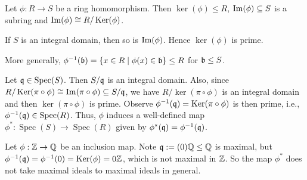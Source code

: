 \begin{fact}\label{1.16}
    Let $\phi: R \to S$ be a ring homomorphism. Then $\ker(\phi) \leq R$, $\operatorname{Im}(\phi) \subseteq S$ is a subring and $\operatorname{Im}(\phi) \cong R/\operatorname{Ker}(\phi)$. \par 
    If $S$ is an integral domain, then so is $\operatorname{Im}(\phi)$. Hence $\ker(\phi)$ is prime. \par
    More generally, $\phi^{-1}(\mathfrak{b}) = \{x \in R \mid \phi(x) \in \mathfrak{b}\} \leq R$ for $\mathfrak{b} \leq S$.
    \begin{center}
    \end{center}
    \par
    Let $\mathfrak{q} \in \operatorname{Spec}(S)$. Then $S/\mathfrak{q}$ is an integral domain. Also, since $R/\operatorname{Ker}(\pi \circ \phi) \cong \operatorname{Im}(\pi \circ \phi) \subseteq S/\mathfrak{q}$, we have $R/\ker(\pi \circ \phi)$ is an integral domain and then $\ker(\pi \circ \phi)$ is prime. Observe $\phi^{-1}(\mathfrak{q}) = \operatorname{Ker}(\pi \circ \phi)$ is then prime, i.e., $\phi^{-1}(\mathfrak{q}) \in \operatorname{Spec}(R)$. Thus, $\phi$ induces a well-defined map $\phi^*: \operatorname{Spec}(S) \to \operatorname{Spec}(R)$ given by $\phi^*(\mathfrak{q}) = \phi^{-1}(\mathfrak{q})$.
    \end{fact}

\begin{example*}
    Let $\phi: \mathbb{Z} \to \mathbb{Q}$ be an inclusion map. Note $\mathfrak{q} := (0)\mathbb{Q} \leq \mathbb{Q}$ is maximal, but $\phi^{-1}(\mathfrak{q}) = \phi^{-1}(0) = \operatorname{Ker}(\phi) = 0 \mathbb{Z}$, which is not maximal in $\mathbb{Z}$. So the map $\phi^*$ does not take maximal ideals to maximal ideals in general.
\end{example*}

